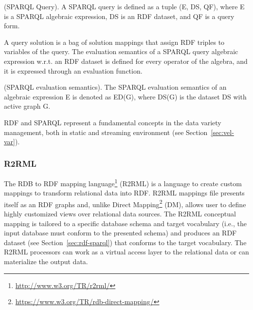 \begin{Definition}
(SPARQL Query). A SPARQL query is defined as a tuple (E, DS, QF), where E is a SPARQL algebraic expression, DS is an RDF dataset, and QF is a query form.
\end{Definition}

A query solution is a bag of solution mappings that assign RDF triples to variables of the query.
The evaluation semantics of a SPARQL query algebraic expression w.r.t. an RDF dataset is defined for every operator of the algebra, and it is expressed through an evaluation function.

\begin{Definition}
(SPARQL evaluation semantics). The SPARQL evaluation semantics of an algebraic expression E is denoted as ED(G), where DS(G) is the dataset DS with active graph G.
\end{Definition}

RDF and SPARQL represent a fundamental concepts in the data variety management, both in static and streaming environment (see Section~\ref{sec:vel-var}).

\subsubsection{R2RML}
The RDB to RDF mapping language\footnote{\url{http://www.w3.org/TR/r2rml/}} (R2RML) is a language to create custom mappings to transform relational data into RDF.
R2RML mappings file presents itself as an RDF graphs and, unlike Direct Mapping\footnote{\url{https://www.w3.org/TR/rdb-direct-mapping/}} (DM), allows user to define highly customized views over relational data sources. The R2RML conceptual mapping is tailored to a specific database schema and target vocabulary (i.e., the input database must conform to the presented schema) and produces an RDF dataset (see Section~\ref{sec:rdf-sparql}) that conforms to the target vocabulary. The R2RML processors can work as a virtual access layer to the relational data or can materialize the output data.

